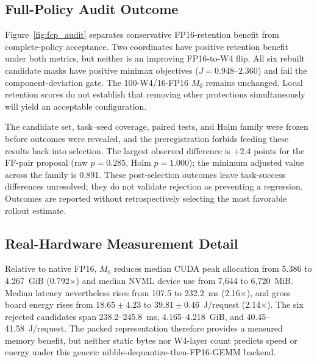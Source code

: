 \subsection{Full-Policy Audit Outcome}
\label{sec:fcp_visualization}





Figure~\ref{fig:fcp_audit} separates conservative FP16-retention benefit from complete-policy acceptance. Two coordinates have positive retention benefit under both metrics, but neither is an improving FP16-to-W4 flip. All six rebuilt candidate masks have positive minimax objectives ($J=0.948$--$2.360$) and fail the component-deviation gate. The 100-W4/16-FP16 $M_0$ remains unchanged. Local retention scores do not establish that removing other protections simultaneously will yield an acceptable configuration.



The candidate set, task--seed coverage, paired tests, and Holm family were frozen before outcomes were revealed, and the preregistration forbids feeding these results back into selection. The largest observed difference is $+2.4$ points for the FF-pair proposal (raw $p=0.285$, Holm $p=1.000$); the minimum adjusted value across the family is 0.891. These post-selection outcomes leave task-success differences unresolved; they do not validate rejection as preventing a regression. Outcomes are reported without retrospectively selecting the most favorable rollout estimate.

\subsection{Real-Hardware Measurement Detail}
\label{sec:hardware_results}



Relative to native FP16, $M_0$ reduces median CUDA peak allocation from 5.386 to 4.267~GiB (0.792$\times$) and median NVML device use from 7,644 to 6,720~MiB. Median latency nevertheless rises from 107.5 to 232.2~ms (2.16$\times$), and gross board energy rises from $18.65\pm4.23$ to $39.81\pm0.46$~J/request (2.14$\times$). The six rejected candidates span 238.2--245.8~ms, 4.165--4.218~GiB, and 40.45--41.58~J/request. The packed representation therefore provides a measured memory benefit, but neither static bytes nor W4-layer count predicts speed or energy under this generic nibble-dequantize-then-FP16-GEMM backend.

